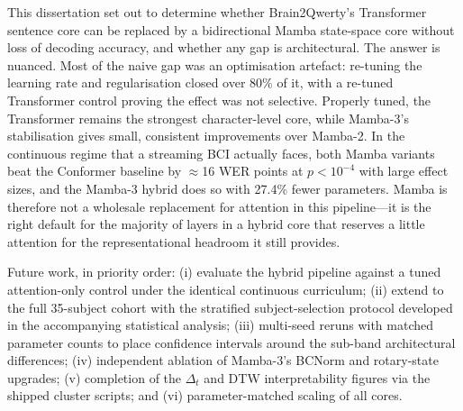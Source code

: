 \documentclass[11pt,a4paper]{report}
\begin{document}
This dissertation set out to determine whether Brain2Qwerty's Transformer
sentence core can be replaced by a bidirectional Mamba state-space core
without loss of decoding accuracy, and whether any gap is architectural.
The answer is nuanced. Most of the naive gap was an optimisation artefact:
re-tuning the learning rate and regularisation closed over 80\% of it, with
a re-tuned Transformer control proving the effect was not selective.
Properly tuned, the Transformer remains the strongest character-level core,
while Mamba-3's stabilisation gives small, consistent improvements over
Mamba-2. In the continuous regime that a streaming BCI actually faces, both
Mamba variants beat the Conformer baseline by $\approx$16 WER points at
$p<10^{-4}$ with large effect sizes, and the Mamba-3 hybrid does so with
27.4\% fewer parameters. Mamba is therefore not a wholesale replacement for
attention in this pipeline---it is the right default for the majority of
layers in a hybrid core that reserves a little attention for the
representational headroom it still provides.

Future work, in priority order: (i) evaluate the hybrid pipeline against a
tuned attention-only control under the identical continuous curriculum;
(ii) extend to the full 35-subject cohort with the stratified
subject-selection protocol developed in the accompanying statistical
analysis; (iii) multi-seed reruns with matched parameter counts to place
confidence intervals around the sub-band architectural differences;
(iv) independent ablation of Mamba-3's BCNorm and rotary-state upgrades;
(v) completion of the $\Delta_t$ and DTW interpretability figures via the
shipped cluster scripts; and (vi) parameter-matched scaling of all cores.



\end{document}
